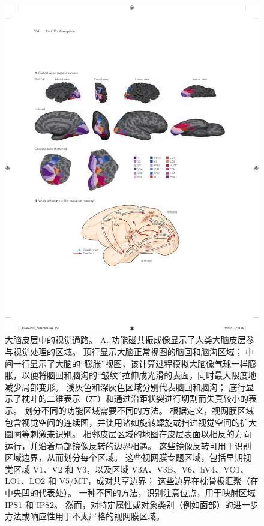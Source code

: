 \begin{figure}[htbp]
	\centering
	\includegraphics[width=1.0\linewidth]{chap21/fig_21_7}
	\caption{大脑皮层中的视觉通路。 
		A. 功能磁共振成像显示了人类大脑皮层参与视觉处理的区域。 
		顶行显示大脑正常视图的脑回和脑沟区域； 中间一行显示了大脑的“膨胀”视图，该计算过程模拟大脑像气球一样膨胀，以便将脑回和脑沟的“皱纹”拉伸成光滑的表面，同时最大限度地减少局部变形。 
		浅灰色和深灰色区域分别代表脑回和脑沟； 底行显示了枕叶的二维表示（左）和通过沿距状裂进行切割而失真较小的表示。 
		划分不同的功能区域需要不同的方法。 
		根据定义，视网膜区域包含视觉空间的连续图，并使用诸如旋转螺旋或扫过视觉空间的扩大圆圈等刺激来识别。 
		相邻皮层区域的地图在皮层表面以相反的方向运行，并沿着局部镜像反转的边界相遇。 
		这些镜像反转可用于识别区域边界，从而划分每个区域。 
		这些视网膜专题区域，包括早期视觉区域 V1、V2 和 V3，以及区域 V3A、V3B、V6、hV4、VO1、LO1、LO2 和 V5/MT，成对共享边界； 这些边界在枕骨极汇聚（在中央凹的代表处）。 
		一种不同的方法，识别注意位点，用于映射区域 IPS1 和 IPS2。 
		然而，对特定属性或对象类别（例如面部）的进一步方法或响应性用于不太严格的视网膜区域。 
}
\end{figure}
